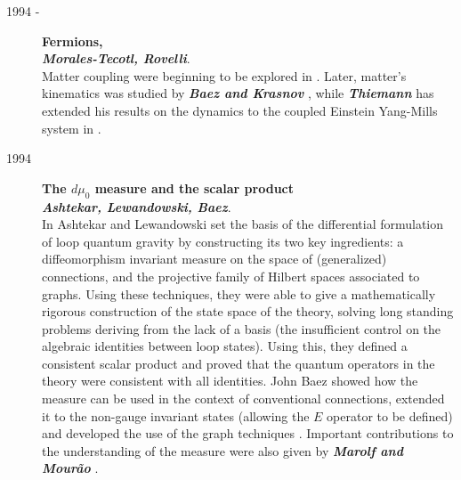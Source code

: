 \begin{description}
	\item[1994 -] {\bf  Fermions,\\
	{\em Morales-Tecotl, Rovelli}}.\\  
	Matter coupling were beginning to be explored in 
	\cite{MoralesRovelli,MoralesRovelli2}.  Later, matter's kinematics 
	was studied by \textbf{\em Baez and Krasnov} 
	\cite{KrasnovMatter,BaezKrasnov}, while \textbf{\em Thiemann\/} 
	has extended his results on the dynamics to the coupled Einstein 
	Yang-Mills system in \cite{ThiemannYM}.

	\item[1994] {\bf  The $d\mu_{0}$ measure and the scalar product\\
	{\em Ashtekar, Lewandowski, Baez}}.\\  
	In \cite{AshtekarLewandowski,AshtekarLewandowski3,AshtekarLewandowski2} 
	Ashtekar and Lewandowski set the basis of the differential 
	formulation of loop quantum gravity by constructing its two key 
	ingredients: a diffeomorphism invariant measure on the space of 
	(generalized) connections, and the projective family of Hilbert 
	spaces associated to graphs.  Using these techniques, they were 
	able to give a mathematically rigorous construction of the state 
	space of the theory, solving long standing problems deriving from 
	the lack of a basis (the insufficient control on the algebraic 
	identities between loop states).  Using this, they defined a 
	consistent scalar product and proved that the quantum operators in 
	the theory were consistent with all identities.  John Baez showed 
	how the measure can be used in the context of conventional 
	connections, extended it to the non-gauge invariant states 
	(allowing the $E$ operator to be defined) and developed the use of 
	the graph techniques \cite{Baez94a,Baez93,Baez2}.  Important 
	contributions to the understanding of the measure were also given 
	by \textbf{\em Marolf and Mour\~ao} \cite{MarolfMourao}.
	

\end{description}
